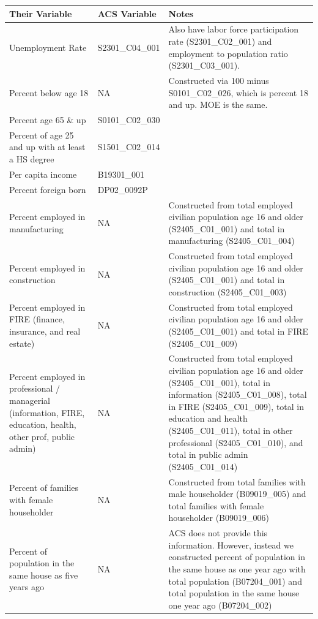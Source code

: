 \documentclass[12pt]{article}
\begin{document}
\begin{table}[ht]
  \centering
  \scriptsize{
  \begin{tabular}{|m{9em}|m{3cm}|m{9cm}|}
    \hline
    Their Variable & ACS Variable & Notes \\
    \hline
    Unemployment Rate & S2301\_C04\_001 & Also have labor force participation rate (S2301\_C02\_001) and employment to population ratio (S2301\_C03\_001).\\\hline

    Percent below age 18 & NA & Constructed via 100 minus S0101\_C02\_026, which is percent 18 and up. MOE is the same.\\\hline
    Percent age 65 \& up & S0101\_C02\_030 & \\\hline
    Percent of age 25 and up with at least a HS degree & S1501\_C02\_014 & \\\hline
    Per capita income & B19301\_001 & \\\hline
    Percent foreign born & DP02\_0092P & \\\hline
    Percent employed in manufacturing & NA & Constructed from total employed civilian population age 16 and older (S2405\_C01\_001) and total in manufacturing (S2405\_C01\_004) \\\hline
    Percent employed in construction & NA & Constructed from total employed civilian population age 16 and older (S2405\_C01\_001) and total in construction (S2405\_C01\_003) \\\hline
    Percent employed in FIRE (finance, insurance, and real estate) & NA & Constructed from total employed civilian population age 16 and older (S2405\_C01\_001) and total in FIRE (S2405\_C01\_009) \\\hline
    Percent employed in professional / managerial (information, FIRE, education, health, other prof, public admin) & NA & Constructed from total employed civilian population age 16 and older (S2405\_C01\_001), total in information (S2405\_C01\_008), total in FIRE (S2405\_C01\_009), total in education and health (S2405\_C01\_011), total in other professional (S2405\_C01\_010), and total in public admin (S2405\_C01\_014) \\\hline
    Percent of families with female householder & NA & Constructed from total families with male householder (B09019\_005) and total families with female householder (B09019\_006)\\\hline
    Percent of population in the same house as five years ago & NA & ACS does not provide this information. However, instead we constructed percent of population in the same house as one year ago with total population (B07204\_001) and total population in the same house one year ago (B07204\_002)\\\hline

\end{tabular}}
\end{table}
\end{document}
